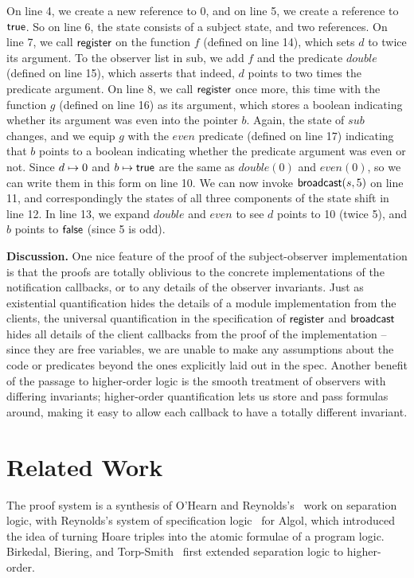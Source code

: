 \documentclass[preprint,natbib]{sigplanconf}
\begin{document}
On line 4, we create a new reference to $0$, and on line 5, we create
a reference to $\mbox{\textsf{{true}}}$. So on line 6, the state consists of a
subject state, and two references.  On line 7, we call
$\mbox{\textsf{{register}}}$ on the function $f$ (defined on line 14), which
sets $d$ to twice its argument. To the observer list in sub, we add
$f$ and the predicate $double$ (defined on line 15), which asserts
that indeed, $d$ points to two times the predicate argument. On line
8, we call $\mbox{\textsf{{register}}}$ once more, this time with the function
$g$ (defined on line 16) as its argument, which stores a boolean
indicating whether its argument was even into the pointer $b$. Again,
the state of $sub$ changes, and we equip $g$ with the $even$ predicate
(defined on line 17) indicating that $b$ points to a boolean
indicating whether the predicate argument was even or not. Since $d
\mapsto 0$ and $b \mapsto \mbox{\textsf{{true}}}$ are the same as
$double(0)$ and $even(0)$, so we can write them in this form on line
10.  We can now invoke $\mbox{\textsf{{broadcast}}}(s, 5)$ on line 11, and
correspondingly the states of all three components of the state shift
in line 12.  In line 13, we expand $double$ and $even$ to see $d$
points to 10 (twice 5), and $b$ points to $\mbox{\textsf{{false}}}$ (since 5
is odd).

\textbf{Discussion.} One nice feature of the proof of the
subject-observer implementation is that the proofs are totally
oblivious to the concrete implementations of the notification
callbacks, or to any details of the observer invariants. Just as
existential quantification hides the details of a module
implementation from the clients, the universal quantification in the
specification of $\mbox{\textsf{{register}}}$ and $\mbox{\textsf{{broadcast}}}$ hides all
details of the client callbacks from the proof of the implementation
-- since they are free variables, we are unable to make any
assumptions about the code or predicates beyond the ones explicitly
laid out in the spec. Another benefit of the passage to higher-order
logic is the smooth treatment of observers with differing invariants;
higher-order quantification lets us store and pass formulas around,
making it easy to allow each callback to have a totally different
invariant. 
\section{Related Work}
The proof system is a synthesis of O'Hearn and
Reynolds's~\cite{sep-logic} work on separation logic, with Reynolds's
system of specification logic~\cite{spec-logic} for Algol, which
introduced the idea of turning Hoare triples into the atomic formulae
of a program logic. Birkedal, Biering, and Torp-Smith~\cite{hosl}
first extended separation logic to higher-order.
\end{document}
